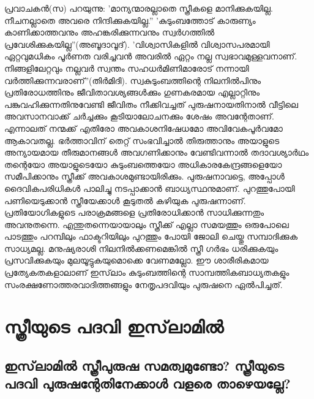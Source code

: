 പ്രവാചകന്‍(സ) പറയുന്നു: 'മാന്യന്മാരല്ലാതെ സ്ത്രീകളെ മാനിക്കുകയില്ല. നീചനല്ലാതെ അവരെ നിന്ദിക്കുകയില്ല.''
'കുടുംബത്തോട് കാരുണ്യം കാണിക്കാത്തവനും അഹങ്കരിക്കുന്നവനും സ്വര്‍ഗത്തില്‍ പ്രവേശിക്കുകയില്ല''(അബൂദാവൂദ്).
'വിശ്വാസികളില്‍ വിശ്വാസപരമായി ഏറ്റവുമധികം പൂര്‍ണത വരിച്ചവന്‍ അവരില്‍ ഏറ്റം നല്ല സ്വഭാവമുള്ളവനാണ്. നിങ്ങളിലേറ്റവും നല്ലവര്‍ സ്വന്തം സഹധര്‍മിണിമാരോട് നന്നായി വര്‍ത്തിക്കുന്നവരാണ്''(തിര്‍മിദി).
സ്വകുടുംബത്തിന്റെ നിലനില്‍പിനും പ്രതിരോധത്തിനും ജീവിതാവശ്യങ്ങള്‍ക്കും ഗുണകരമായ എല്ലാറ്റിനും പങ്കുവഹിക്കുന്നതിനുവേണ്ടി ജീവിതം നീക്കിവച്ചത് പുരുഷനായതിനാല്‍ വീട്ടിലെ അവസാനവാക്ക് ചര്‍ച്ചക്കും കൂടിയാലോചനക്കും ശേഷം അവന്റേതാണ്. എന്നാലത് നന്മക്ക് എതിരോ അവകാശനിഷേധമോ അവിവേകപൂര്‍വമോ ആകാവതല്ല. ഭര്‍ത്താവിന് തെറ്റ് സംഭവിച്ചാല്‍ തിരുത്താനും അയാളുടെ അന്യായമായ തീരുമാനങ്ങള്‍ അവഗണിക്കാനും വേണ്ടിവന്നാല്‍ തദാവശ്യാര്‍ഥം തന്റെയോ അയാളുടെയോ കുടുംബത്തെയോ അധികാരകേന്ദ്രങ്ങളെയോ സമീപിക്കാനും സ്ത്രീക്ക് അവകാശമുണ്ടായിരിക്കും. പുരുഷനാവട്ടെ, അപ്പോള്‍ ദൈവികപരിധികള്‍ പാലിച്ചു നടപ്പാക്കാന്‍ ബാധ്യസ്ഥനുമാണ്.
പുറത്തുപോയി പണിയെടുക്കാന്‍ സ്ത്രീയേക്കാള്‍ കൂടുതല്‍ കഴിയുക പുരുഷന്നാണ്. പ്രതിയോഗികളുടെ പരാക്രമങ്ങളെ പ്രതിരോധിക്കാന്‍ സാധിക്കുന്നതും അവനുതന്നെ. എന്തുതന്നെയായാലും സ്ത്രീക്ക് എല്ലാ സമയത്തും ഒരുപോലെ പാടത്തും പറമ്പിലും ഫാക്ടറിയിലും പുറത്തും പോയി ജോലി ചെയ്തു സമ്പാദിക്കുക സാധ്യമല്ല. മനുഷ്യരാശി നിലനില്‍ക്കണമെങ്കില്‍ സ്ത്രീ ഗര്‍ഭം ധരിക്കുകയും പ്രസവിക്കുകയും മുലയൂട്ടുകയുമൊക്കെ വേണമല്ലോ. ഈ ശാരീരികമായ പ്രത്യേകതകളാലാണ് ഇസ്‌ലാം കുടുംബത്തിന്റെ സാമ്പത്തികബാധ്യതകളും സംരക്ഷണോത്തരവാദിത്തങ്ങളും നേതൃപദവിയും പുരുഷനെ ഏല്‍പിച്ചത്.
\chapter{സ്ത്രീയുടെ പദവി ഇസ്‌ലാമില്‍ }
  \section{ഇസ്‌ലാമില്‍ സ്ത്രീപുരുഷ സമത്വമുണ്ടോ? സ്ത്രീയുടെ പദവി പുരുഷന്റേതിനേക്കാള്‍ വളരെ താഴെയല്ലേ?}

